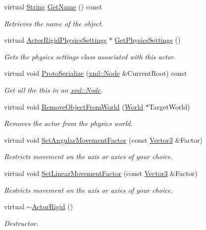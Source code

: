 \begin{DoxyCompactItemize}
virtual \hyperlink{namespacephys_aa03900411993de7fbfec4789bc1d392e}{String} \hyperlink{classphys_1_1ActorRigid_a63952e0b7ab7176ae60d96756dd84b43}{GetName} () const 
\begin{DoxyCompactList}\small\item\em Retrieves the name of the object. \item\end{DoxyCompactList}\item 
virtual \hyperlink{classphys_1_1ActorRigidPhysicsSettings}{ActorRigidPhysicsSettings} $\ast$ \hyperlink{classphys_1_1ActorRigid_ac531871f990894cf64d0ece918eb18d0}{GetPhysicsSettings} ()
\begin{DoxyCompactList}\small\item\em Gets the physics settings class associated with this actor. \item\end{DoxyCompactList}\item 
virtual void \hyperlink{classphys_1_1ActorRigid_add4e731eb3a5481d05e2d0f543745fcd}{ProtoSerialize} (\hyperlink{classphys_1_1xml_1_1Node}{xml::Node} \&CurrentRoot) const 
\begin{DoxyCompactList}\small\item\em Get all the this in an \hyperlink{classphys_1_1xml_1_1Node}{xml::Node}. \item\end{DoxyCompactList}\item 
virtual void \hyperlink{classphys_1_1ActorRigid_a7101df2a149e0ccb3678b7c2c00998f8}{RemoveObjectFromWorld} (\hyperlink{classphys_1_1World}{World} $\ast$TargetWorld)
\begin{DoxyCompactList}\small\item\em Removes the actor from the physics world. \item\end{DoxyCompactList}\item 
virtual void \hyperlink{classphys_1_1ActorRigid_a574fc272f603b879643872dbced36cc2}{SetAngularMovementFactor} (const \hyperlink{classphys_1_1Vector3}{Vector3} \&Factor)
\begin{DoxyCompactList}\small\item\em Restricts movement on the axis or axies of your choice. \item\end{DoxyCompactList}\item 
virtual void \hyperlink{classphys_1_1ActorRigid_a2a6aca8c598716ee24558878f869f163}{SetLinearMovementFactor} (const \hyperlink{classphys_1_1Vector3}{Vector3} \&Factor)
\begin{DoxyCompactList}\small\item\em Restricts movement on the axis or axies of your choice. \item\end{DoxyCompactList}\item 
virtual \hyperlink{classphys_1_1ActorRigid_ab317b5a2578157e54655a1aea8f4d058}{$\sim$ActorRigid} ()
\begin{DoxyCompactList}\small\item\em Destructor. \item\end{DoxyCompactList}\end{DoxyCompactItemize}

